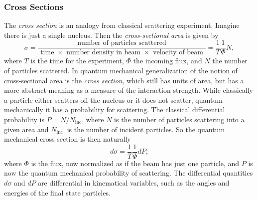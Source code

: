 \documentclass[aps,prb,superscriptaddress,nofootinbib]{revtex4}
\begin{document}
\subsubsection{Cross Sections}
The \textit{cross section} is an analogy from classical scattering experiment.
Imagine there is just a single nucleus. 
Then the \textit{cross-sectional area} is given by
\begin{equation}
	\sigma=\frac{\text { number of particles scattered }}{\text { time } \times \text { number density in beam } \times \text { velocity of beam }}=\frac{1}{T} \frac{1}{\Phi} N,
\end{equation}
where $T$ is the time for the experiment, $\Phi$ the incoming flux, and $N$ the number of particles scattered.
In quantum mechanical generalization of the notion of cross-sectional area is the \textit{cross section}, which still has units of area, but has a more abstract meaning as a measure of the interaction strength. 
While classically a particle either scatters off the nucleus or it does not scatter, quantum mechanically it has a probability for scattering. 
The classical differential probability is $P=N/N_{\text{inc}}$, where $N$ is the number of particles scattering into a given area and $N_{\text {inc }}$ is the number of incident particles. 
So the quantum mechanical cross section is then naturally
\begin{equation}
	d \sigma=\frac{1}{T} \frac{1}{\Phi} d P,
\end{equation}
where $\Phi$ is the flux, now normalized as if the beam has just one particle, and $P$ is now the quantum mechanical probability of scattering. 
The differential quantities $d \sigma$ and $d P$ are differential in kinematical variables, such as the angles and energies of the final state particles.  
\end{document}
